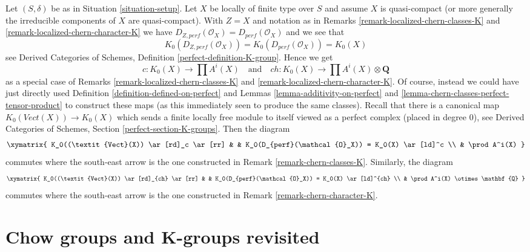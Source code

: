 \begin{remark}
\label{remark-chern-classes-agree}
Let $(S, \delta)$ be as in Situation \ref{situation-setup}.
Let $X$ be locally of finite type over $S$ and assume $X$
is quasi-compact (or more generally the irreducible components
of $X$ are quasi-compact). With $Z = X$ and notation as in
Remarks \ref{remark-localized-chern-classes-K} and
\ref{remark-localized-chern-character-K}
we have $D_{Z, perf}(\mathcal{O}_X) = D_{perf}(\mathcal{O}_X)$
and we see that
$$
K_0(D_{Z, perf}(\mathcal{O}_X)) = K_0(D_{perf}(\mathcal{O}_X)) = K_0(X)
$$
see 
Derived Categories of Schemes, Definition \ref{perfect-definition-K-group}.
Hence we get
$$
c : K_0(X) \to \prod A^i(X)
\quad\text{and}\quad
ch : K_0(X) \to \prod A^i(X) \otimes \mathbf{Q}
$$
as a special case of Remarks \ref{remark-localized-chern-classes-K} and
\ref{remark-localized-chern-character-K}. Of course, instead we could
have just directly used Definition \ref{definition-defined-on-perfect} and
Lemmas \ref{lemma-additivity-on-perfect} and
\ref{lemma-chern-classes-perfect-tensor-product} to construct these maps
(as this immediately seen to produce the same classes).
Recall that there is a canonical map $K_0(\textit{Vect}(X)) \to K_0(X)$
which sends a finite locally free module to itself viewed
as a perfect complex (placed in degree $0$), see
Derived Categories of Schemes, Section \ref{perfect-section-K-groups}.
Then the diagram
$$
\xymatrix{
K_0((\textit{Vect}(X)) \ar[rd]_c \ar[rr] & &
K_0(D_{perf}(\mathcal{O}_X)) = K_0(X) \ar[ld]^c \\
& \prod A^i(X)
}
$$
commutes where the south-east arrow is the one constructed in
Remark \ref{remark-chern-classes-K}. Similarly, the diagram
$$
\xymatrix{
K_0((\textit{Vect}(X)) \ar[rd]_{ch} \ar[rr] & &
K_0(D_{perf}(\mathcal{O}_X)) = K_0(X) \ar[ld]^{ch} \\
& \prod A^i(X) \otimes \mathbf{Q}
}
$$
commutes where the south-east arrow is the one constructed in
Remark \ref{remark-chern-character-K}.
\end{remark}











\section{Chow groups and K-groups revisited}
\label{section-chow-and-K-II}


